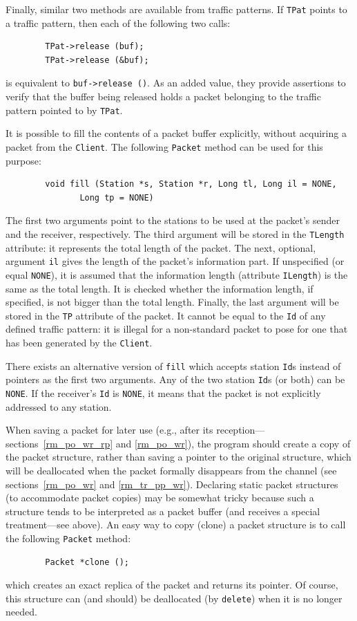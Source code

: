 Finally, similar two methods are available from traffic patterns.
If {\tt TPat} points to a traffic pattern, then each of the following two calls:
\begin{verbatim}
        TPat->release (buf);
        TPat->release (&buf);
\end{verbatim}
is equivalent to {\tt buf->release~()}.
As an added value, they provide assertions to verify that
the buffer being released holds a packet belonging to the traffic pattern
pointed to by {\tt TPat}.

It is possible to fill the contents of a packet buffer explicitly, without
acquiring a packet from the {\tt Client}.
The following {\tt Packet} method can be used for this purpose:
\begin{verbatim}
        void fill (Station *s, Station *r, Long tl, Long il = NONE,
               Long tp = NONE)
\end{verbatim}
\noindent
The first two arguments point to the stations to be used at the packet's
sender and the receiver, respectively.
The third argument will be stored in the {\tt TLength} attribute: it
represents the total length of the packet.
The next, optional, argument {\tt il} gives the length of the packet's
information part.
If unspecified (or equal {\tt NONE}), it is assumed that the information
length (attribute {\tt ILength}) is the same as the total length.
It is checked whether the information length, if specified,
is not bigger than the total length.
Finally, the last argument will be stored in the {\tt TP} attribute of
the packet.
It cannot be equal to the {\tt Id} of any defined traffic pattern:
it is illegal for a non-standard packet to pose for one that has been
generated by the {\tt Client}.

There exists an alternative version of {\tt fill} which accepts station
{\tt Id}s instead of pointers as the first two arguments.
Any of the two station {\tt Id}s (or both) can be {\tt NONE}.
If the receiver's {\tt Id} is {\tt NONE},
it means that the packet is not explicitly addressed to any station.

When saving a packet for later use (e.g.,
after its reception---sections~\ref{rm_po_wr_rp} and \ref{rm_po_wr}),
the program should create a copy of the packet structure, rather than
saving a pointer to the original structure, which will be deallocated
when the packet formally disappears from the channel (see
sections~\ref{rm_po_wr} and \ref{rm_tr_pp_wr}).
Declaring static packet structures (to accommodate packet copies) may be
somewhat tricky because such a structure tends to be interpreted as a packet
buffer (and receives a special treatment---see above).
An easy way to copy (clone) a packet structure is to call the following
{\tt Packet} method:
\begin{verbatim}
        Packet *clone ();
\end{verbatim}
which creates an exact replica of the packet and returns its
pointer.
Of course, this structure can (and
should) be deallocated (by {\tt delete}) when it is no longer needed.

